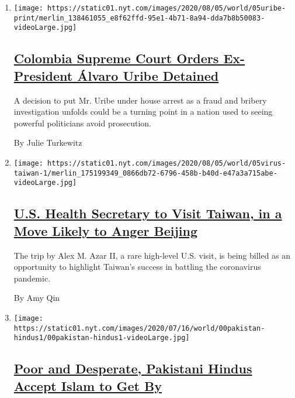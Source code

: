 \begin{enumerate}
\def\labelenumi{\arabic{enumi}.}
\item
  \texttt{[image: https://static01.nyt.com/images/2020/08/05/world/05uribe-print/merlin\_138461055\_e8f62ffd-95e1-4b71-8a94-dda7b8b50083-videoLarge.jpg]}

  \hypertarget{colombia-supreme-court-orders-ex-president-uxe1lvaro-uribe-detained}{%
  \subsection{\texorpdfstring{\href{/2020/08/04/world/americas/colombia-president-uribe-charged.html}{Colombia
  Supreme Court Orders Ex-President Álvaro Uribe
  Detained}}{Colombia Supreme Court Orders Ex-President Álvaro Uribe Detained}}\label{colombia-supreme-court-orders-ex-president-uxe1lvaro-uribe-detained}}

  A decision to put Mr. Uribe under house arrest as a fraud and bribery
  investigation unfolds could be a turning point in a nation used to
  seeing powerful politicians avoid prosecution.

  By Julie Turkewitz
\item
  \texttt{[image: https://static01.nyt.com/images/2020/08/05/world/05virus-taiwan-1/merlin\_175199349\_0866db72-6796-458b-b40d-e47a3a715abe-videoLarge.jpg]}

  \hypertarget{us-health-secretary-to-visit-taiwan-in-a-move-likely-to-anger-beijing}{%
  \subsection{\texorpdfstring{\href{/2020/08/04/world/asia/taiwan-azar-beijing-coronavirus.html}{U.S.
  Health Secretary to Visit Taiwan, in a Move Likely to Anger
  Beijing}}{U.S. Health Secretary to Visit Taiwan, in a Move Likely to Anger Beijing}}\label{us-health-secretary-to-visit-taiwan-in-a-move-likely-to-anger-beijing}}

  The trip by Alex M. Azar II, a rare high-level U.S. visit, is being
  billed as an opportunity to highlight Taiwan's success in battling the
  coronavirus pandemic.

  By Amy Qin
\item
  \texttt{[image: https://static01.nyt.com/images/2020/07/16/world/00pakistan-hindus1/00pakistan-hindus1-videoLarge.jpg]}

  \hypertarget{poor-and-desperate-pakistani-hindus-accept-islam-to-get-by}{%
  \subsection{\texorpdfstring{\href{/2020/08/04/world/asia/pakistan-hindu-conversion.html}{Poor
  and Desperate, Pakistani Hindus Accept Islam to Get
  By}}{Poor and Desperate, Pakistani Hindus Accept Islam to Get By}}\label{poor-and-desperate-pakistani-hindus-accept-islam-to-get-by}}


\end{enumerate}
